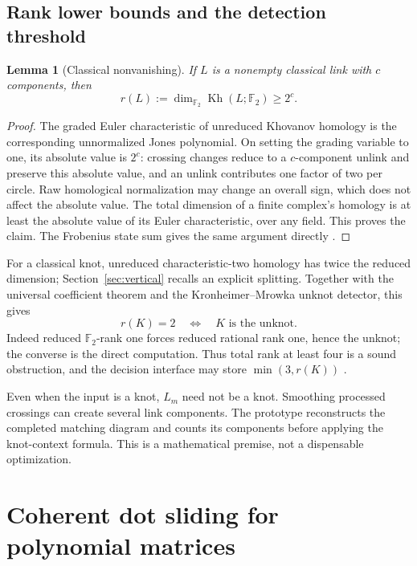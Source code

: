 \documentclass[11pt]{article}
\newtheorem{lemma}[theorem]{Lemma}
\theoremstyle{definition}\newtheorem{definition}[theorem]{Definition}\newtheorem{example}[theorem]{Example}
\theoremstyle{remark}\newtheorem{remark}[theorem]{Remark}
\newcommand{\F}{{\mathbb{F}_2}}
\newcommand{\Kh}{\operatorname{Kh}}
\begin{document}
\subsection{Rank lower bounds and the detection threshold}
\begin{lemma}[Classical nonvanishing]\label{lem:nonvanishing}
If $L$ is a nonempty classical link with $c$ components, then
\[
 r(L):=\dim_\F\Kh(L;\F)\ge 2^c.
\]
\end{lemma}
\begin{proof}
The graded Euler characteristic of unreduced Khovanov homology is the corresponding unnormalized Jones polynomial. On setting the grading variable to one, its absolute value is $2^c$: crossing changes reduce to a $c$-component unlink and preserve this absolute value, and an unlink contributes one factor of two per circle. Raw homological normalization may change an overall sign, which does not affect the absolute value. The total dimension of a finite complex's homology is at least the absolute value of its Euler characteristic, over any field. This proves the claim. The Frobenius state sum gives the same argument directly \cite{Khovanov}.
\end{proof}

For a classical knot, unreduced characteristic-two homology has twice the reduced dimension; Section~\ref{sec:vertical} recalls an explicit splitting. Together with the universal coefficient theorem and the Kronheimer--Mrowka unknot detector, this gives
\begin{equation}\label{eq:detector}
 r(K)=2\quad\Longleftrightarrow\quad K\text{ is the unknot}.
\end{equation}
Indeed reduced $\F$-rank one forces reduced rational rank one, hence the unknot; the converse is the direct computation. Thus total rank at least four is a sound obstruction, and the decision interface may store $\min(3,r(K))$ \cite{KM,Shumakovitch}.

Even when the input is a knot, $L_m$ need not be a knot. Smoothing processed crossings can create several link components. The prototype reconstructs the completed matching diagram and counts its components before applying the knot-context formula. This is a mathematical premise, not a dispensable optimization.

\section{Coherent dot sliding for polynomial matrices}
\end{document}
